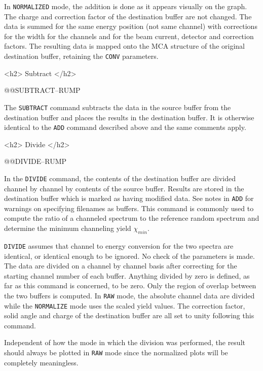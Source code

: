 {{{{{In {\tt NORMALIZED} mode, the addition is done as it appears visually on the
graph.  The charge and correction factor of the destination buffer are not
changed.  The data is summed for the same energy position (not same channel)
with corrections for the width for the channels and for the beam current,
detector and correction factors.  The resulting data is mapped onto the MCA
structure of the original destination buffer, retaining the {\tt CONV}
parameters.

\newpage
<h2> Subtract </h2>


@@{SUBTRACT--RUMP}

The {\tt SUBTRACT} command subtracts the data in the source buffer from the
destination buffer and places the results in the destination buffer.  It is
otherwise identical to the {\tt ADD} command described above and the same
comments apply.


<h2> Divide </h2>


@@{DIVIDE--RUMP}

In the {\tt DIVIDE} command, the contents of the destination buffer are
divided channel by channel by contents of the source buffer.  Results are
stored in the destination buffer which is marked as having modified data.
See notes in {\tt ADD} for warnings on specifying filenames as buffers.
This command is commonly used to compute the ratio of a channeled spectrum to
the reference random spectrum and determine the minimum channeling yield
$\chi_{min}$.  

{\tt DIVIDE} assumes that channel to energy conversion for the two spectra are
identical, or identical enough to be ignored.  No check of the parameters is
made.  The data are divided on a channel by channel basis after correcting for
the starting channel number of each buffer.  Anything divided by zero is
defined, as far as this command is concerned, to be zero.  Only the region of
overlap between the two buffers is computed.  In {\tt RAW} mode, the absolute
channel data are divided while the {\tt NORMALIZE} mode uses the scaled yield
values.  The correction factor, solid angle and charge of the destination
buffer are all set to unity following this command.

Independent of how the mode in which the division was performed, the result
should always be plotted in {\tt RAW} mode since the normalized plots will be
completely meaningless.

}}}}}
